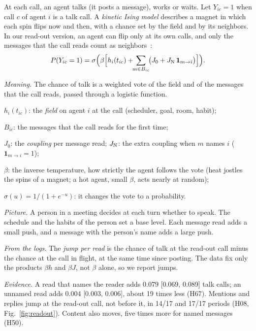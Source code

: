 At each call, an agent talks (it posts a message), works or waits. Let $Y_{ic}=1$ when call $c$ of agent $i$ is a talk call. A \emph{kinetic Ising model} describes a magnet in which each spin flips now and then, with a chance set by the field and by its neighbors. In our read-out version, an agent can flip only at its own calls, and only the messages that the call reads count as neighbors~\cite{glauber1963,aguilera2026}:
\begin{equation}
P(Y_{ic}=1)=\sigma\Big(\beta\Big[h_i(t_{ic})+\!\!\sum_{m\in B_{ic}}\!\!\big(J_0+J_{\rm N}\,\mathbf 1_{m\to i}\big)\Big]\Big).
\label{eq:pic-kinetic}
\end{equation}

\emph{Meaning.} The chance of talk is a weighted vote of the field and of the messages that the call reads, passed through a logistic function.
\begin{tightitem}
\item $h_i(t_{ic})$: the \emph{field} on agent $i$ at the call (scheduler, goal, room, habit);
\item $B_{ic}$: the messages that the call reads for the first time;
\item $J_0$: the \emph{coupling} per message read; $J_{\rm N}$: the extra coupling when $m$ names $i$ ($\mathbf 1_{m\to i}=1$);
\item $\beta$: the inverse temperature, how strictly the agent follows the vote (heat jostles the spins of a magnet; a hot agent, small $\beta$, acts nearly at random);
\item $\sigma(u)=1/(1+e^{-u})$: it changes the vote to a probability.
\end{tightitem}
\emph{Picture.} A person in a meeting decides at each turn whether to speak. The schedule and the habits of the person set a base level. Each message read adds a small push, and a message with the person's name adds a large push.

\emph{From the logs.} The \emph{jump per read} is the chance of talk at the read-out call minus the chance at the call in flight, at the same time since posting. The data fix only the products $\beta h$ and $\beta J$, not $\beta$ alone, so we report jumps.

\emph{Evidence.} A read that names the reader adds 0.079 [0.069, 0.089] talk calls; an unnamed read adds 0.004 [0.003, 0.006], about 19 times less (H67). Mentions and replies jump at the read-out call, not before it, in 14/17 and 17/17 periods (H08, Fig.~\ref{fig:readout}). Content also moves, five times more for named messages (H50).

